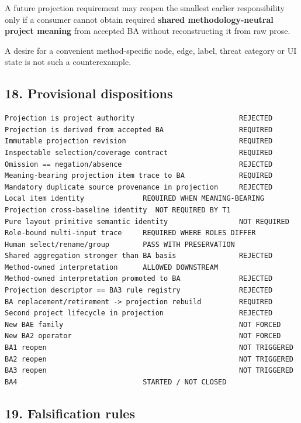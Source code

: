 \documentclass[11pt,a4paper]{article}
\begin{document}
A future projection requirement may reopen the smallest earlier responsibility only if a consumer cannot obtain required \textbf{shared methodology-neutral project meaning} from accepted BA without reconstructing it from raw prose.

A desire for a convenient method-specific node, edge, label, threat category or UI state is not such a counterexample.

\subsection{18. Provisional dispositions}\label{18-provisional-dispositions}

\begin{verbatim}
Projection is project authority                         REJECTED
Projection is derived from accepted BA                  REQUIRED
Immutable projection revision                           REQUIRED
Inspectable selection/coverage contract                 REQUIRED
Omission == negation/absence                            REJECTED
Meaning-bearing projection item trace to BA             REQUIRED
Mandatory duplicate source provenance in projection     REJECTED
Local item identity              REQUIRED WHEN MEANING-BEARING
Projection cross-baseline identity  NOT REQUIRED BY T1
Pure layout primitive semantic identity                 NOT REQUIRED
Role-bound multi-input trace     REQUIRED WHERE ROLES DIFFER
Human select/rename/group        PASS WITH PRESERVATION
Shared aggregation stronger than BA basis               REJECTED
Method-owned interpretation      ALLOWED DOWNSTREAM
Method-owned interpretation promoted to BA              REJECTED
Projection descriptor == BA3 rule registry              REJECTED
BA replacement/retirement -> projection rebuild         REQUIRED
Second project lifecycle in projection                  REJECTED
New BAE family                                          NOT FORCED
New BA2 operator                                        NOT FORCED
BA1 reopen                                              NOT TRIGGERED
BA2 reopen                                              NOT TRIGGERED
BA3 reopen                                              NOT TRIGGERED
BA4                              STARTED / NOT CLOSED
\end{verbatim}

\subsection{19. Falsification rules}\label{19-falsification-rules}
\end{document}
